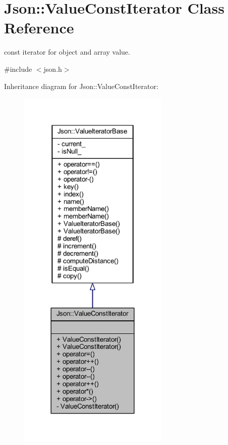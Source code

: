 \hypertarget{class_json_1_1_value_const_iterator}{}\section{Json\+:\+:Value\+Const\+Iterator Class Reference}
\label{class_json_1_1_value_const_iterator}


const iterator for object and array value.  




{\ttfamily \#include $<$json.\+h$>$}



Inheritance diagram for Json\+:\+:Value\+Const\+Iterator\+:\nopagebreak
\begin{figure}[H]
\begin{center}
\leavevmode
\includegraphics[width=203pt]{class_json_1_1_value_const_iterator__inherit__graph}
\end{center}
\end{figure}


